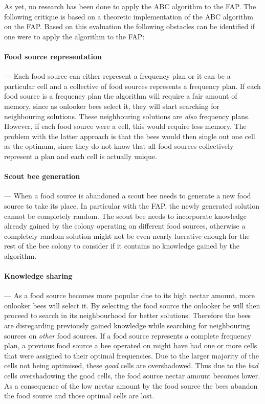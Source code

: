 As yet, no research has been done to apply the \gls{ABC} algorithm to the \gls{FAP}. The following critique is based on a theoretic implementation of the \gls{ABC} algorithm on the \gls{FAP}. Based on this evaluation the following obstacles can be identified if one were to apply the algorithm to the \gls{FAP}:
\paragraph{Food source representation}
--- Each food source can either represent a frequency plan or it can be a particular cell and a collective of food sources represents a frequency plan. If each food source is a frequency plan the algorithm will require a fair amount of memory, since as onlooker bees select it, they will start searching for neighbouring solutions. These neighbouring solutions are \emph{also} frequency plans. However, if each food source were a cell, this would require less memory. The problem with the latter approach is that the bees would then single out one cell as the optimum, since they do not know that all food sources collectively represent a plan and each cell is actually unique.
\paragraph{Scout bee generation}
--- When a food source is abandoned a scout bee needs to generate a new food source to take its place. In particular with the \gls{FAP}, the newly generated solution cannot be completely random. The scout bee needs to incorporate knowledge already gained by the colony operating on different food sources, otherwise a completely random solution might not be even nearly lucrative enough for the rest of the bee colony to consider if it contains no knowledge gained by the algorithm.
\paragraph{Knowledge sharing}
--- As a food source becomes more popular due to its high nectar amount, more onlooker bees will select it. By selecting the food source the onlooker be will then proceed to search in its neighbourhood for better solutions. Therefore the bees are disregarding previously gained knowledge while searching for neighbouring sources on \emph{other} food sources. If a food source represents a complete frequency plan, a previous food source a bee operated on might have had one or more cells that were assigned to their optimal frequencies. Due to the larger majority of the cells not being optimised, these \emph{good} cells are overshadowed. Thus due to the \emph{bad} cells overshadowing the good cells, the food source nectar amount becomes lower. As a consequence of the low nectar amount by the food source the bees abandon the food source and those optimal cells are lost.

